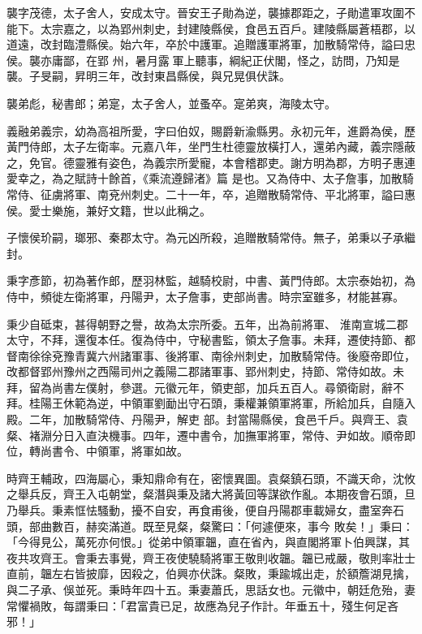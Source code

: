\begin{pinyinscope}
 襲字茂德，太子舍人，安成太守。晉安王子勛為逆，襲據郡距之，子勛遣軍攻圍不能下。太宗嘉之，以為郢州刺史，封建陵縣侯，食邑五百戶。建陵縣屬蒼梧郡，以道遠，改封臨澧縣侯。始六年，卒於中護軍。追贈護軍將軍，加散騎常侍，謚曰忠侯。襲亦庸鄙，在郢
 州，暑月露軍上聽事，綱紀正伏閣，怪之，訪問，乃知是襲。子旻嗣，昇明三年，改封東昌縣侯，與兄晃俱伏誅。



 襲弟彪，秘書郎；弟寔，太子舍人，並蚤卒。寔弟爽，海陵太守。



 義融弟義宗，幼為高祖所愛，字曰伯奴，賜爵新渝縣男。永初元年，進爵為侯，歷黃門侍郎，太子左衛率。元嘉八年，坐門生杜德靈放橫打人，還弟內藏，義宗隱蔽之，免官。德靈雅有姿色，為義宗所愛寵，本會稽郡吏。謝方明為郡，方明子惠連愛幸之，為之賦詩十餘首，《乘流遵歸渚》篇
 是也。又為侍中、太子詹事，加散騎常侍、征虜將軍、南兗州刺史。二十一年，卒，追贈散騎常侍、平北將軍，謚曰惠侯。愛士樂施，兼好文籍，世以此稱之。



 子懷侯玠嗣，瑯邪、秦郡太守。為元凶所殺，追贈散騎常侍。無子，弟秉以子承繼封。



 秉字彥節，初為著作郎，歷羽林監，越騎校尉，中書、黃門侍郎。太宗泰始初，為侍中，頻徙左衛將軍，丹陽尹，太子詹事，吏部尚書。時宗室雖多，材能甚寡。



 秉少自砥束，甚得朝野之譽，故為太宗所委。五年，出為前將軍、
 淮南宣城二郡太守，不拜，還復本任。復為侍中，守秘書監，領太子詹事。未拜，遷使持節、都督南徐徐兗豫青冀六州諸軍事、後將軍、南徐州刺史，加散騎常侍。後廢帝即位，改都督郢州豫州之西陽司州之義陽二郡諸軍事、郢州刺史，持節、常侍如故。未拜，留為尚書左僕射，參選。元徽元年，領吏部，加兵五百人。尋領衛尉，辭不拜。桂陽王休範為逆，中領軍劉勔出守石頭，秉權兼領軍將軍，所給加兵，自隨入殿。二年，加散騎常侍、丹陽尹，解吏
 部。封當陽縣侯，食邑千戶。與齊王、袁粲、褚淵分日入直決機事。四年，遷中書令，加撫軍將軍，常侍、尹如故。順帝即位，轉尚書令、中領軍，將軍如故。



 時齊王輔政，四海屬心，秉知鼎命有在，密懷異圖。袁粲鎮石頭，不識天命，沈攸之舉兵反，齊王入屯朝堂，粲潛與秉及諸大將黃回等謀欲作亂。本期夜會石頭，旦乃舉兵。秉素恇怯騷動，擾不自安，再食甫後，便自丹陽郡車載婦女，盡室奔石頭，部曲數百，赫奕滿道。既至見粲，粲驚曰：「何遽便來，事今
 敗矣！」秉曰：「今得見公，萬死亦何恨。」從弟中領軍韞，直在省內，與直閣將軍卜伯興謀，其夜共攻齊王。會秉去事覺，齊王夜使驍騎將軍王敬則收韞。韞已戒嚴，敬則率壯士直前，韞左右皆披靡，因殺之，伯興亦伏誅。粲敗，秉踰城出走，於額簷湖見擒，與二子承、俁並死。秉時年四十五。秉妻蕭氏，思話女也。元徽中，朝廷危殆，妻常懼禍敗，每謂秉曰：「君富貴已足，故應為兒子作計。年垂五十，殘生何足吝邪！」




\end{pinyinscope}
